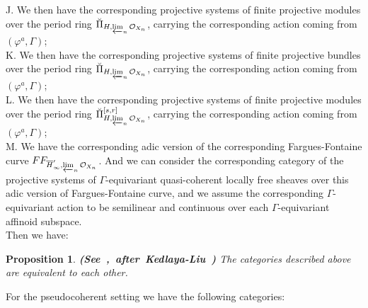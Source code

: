 \documentclass[12pt]{amsart}
\newtheorem{proposition}[theorem]{Proposition}
\theoremstyle{definition}
\numberwithin{equation}{section}
\begin{document}
\noindent J. We then have the corresponding projective systems of finite projective modules over the period ring ${\breve{\Pi}}_{H,\varprojlim_n\mathcal{O}_{X_n}}$, carrying the corresponding action coming from $(\varphi^a,\Gamma)$;\\
\noindent K. We then have the corresponding projective systems of finite projective bundles over the period ring ${\breve{\Pi}}_{H,\varprojlim_n\mathcal{O}_{X_n}}$, carrying the corresponding action coming from $(\varphi^a,\Gamma)$;\\
\noindent L. We then have the corresponding projective systems of finite projective modules over the period ring ${\breve{\Pi}}^{[s,r]}_{H,\varprojlim_n\mathcal{O}_{X_n}}$, carrying the corresponding action coming from $(\varphi^a,\Gamma)$;\\
\noindent M. We have the corresponding adic version of the corresponding Fargues-Fontaine curve $FF_{\overline{H}'_\infty,\varprojlim_n\mathcal{O}_{X_n}}$. And we can consider the corresponding category of the projective systems of $\Gamma$-equivariant quasi-coherent locally free sheaves over this adic version of Fargues-Fontaine curve, and we assume the corresponding $\Gamma$-equivariant action to be semilinear and continuous over each $\Gamma$-equivariant affinoid subspace.\\


\indent Then we have:


\begin{proposition}\mbox{\bf{(See \cite[Theorem 4.11]{XT2}, after Kedlaya-Liu \cite[Theorem 5.7.4]{KL16})}}
The categories described above are equivalent to each other. 	
\end{proposition}



\indent For the pseudocoherent setting we have the following categories:
\end{document}

